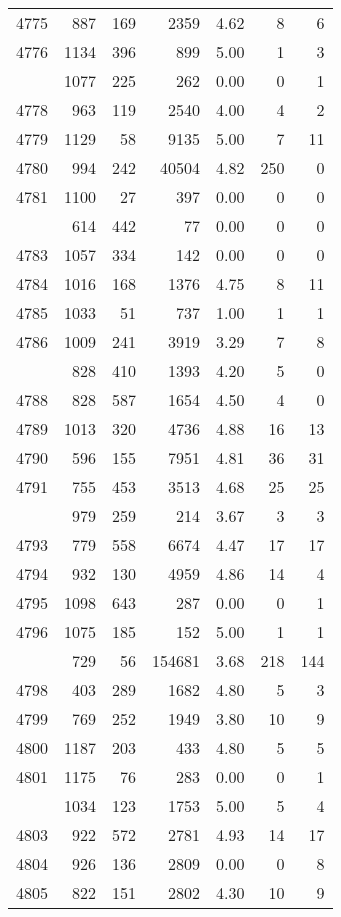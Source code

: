 \documentclass[
]{article}
\begin{document}
\begin{table}
\begin{tabular}[t]{lrrrrrr}
4775 & 887 & 169 & 2359 & 4.62 & 8 & 6\\
4776 & 1134 & 396 & 899 & 5.00 & 1 & 3\\
\addlinespace
4777 & 1077 & 225 & 262 & 0.00 & 0 & 1\\
4778 & 963 & 119 & 2540 & 4.00 & 4 & 2\\
4779 & 1129 & 58 & 9135 & 5.00 & 7 & 11\\
4780 & 994 & 242 & 40504 & 4.82 & 250 & 0\\
4781 & 1100 & 27 & 397 & 0.00 & 0 & 0\\
\addlinespace
4782 & 614 & 442 & 77 & 0.00 & 0 & 0\\
4783 & 1057 & 334 & 142 & 0.00 & 0 & 0\\
4784 & 1016 & 168 & 1376 & 4.75 & 8 & 11\\
4785 & 1033 & 51 & 737 & 1.00 & 1 & 1\\
4786 & 1009 & 241 & 3919 & 3.29 & 7 & 8\\
\addlinespace
4787 & 828 & 410 & 1393 & 4.20 & 5 & 0\\
4788 & 828 & 587 & 1654 & 4.50 & 4 & 0\\
4789 & 1013 & 320 & 4736 & 4.88 & 16 & 13\\
4790 & 596 & 155 & 7951 & 4.81 & 36 & 31\\
4791 & 755 & 453 & 3513 & 4.68 & 25 & 25\\
\addlinespace
4792 & 979 & 259 & 214 & 3.67 & 3 & 3\\
4793 & 779 & 558 & 6674 & 4.47 & 17 & 17\\
4794 & 932 & 130 & 4959 & 4.86 & 14 & 4\\
4795 & 1098 & 643 & 287 & 0.00 & 0 & 1\\
4796 & 1075 & 185 & 152 & 5.00 & 1 & 1\\
\addlinespace
4797 & 729 & 56 & 154681 & 3.68 & 218 & 144\\
4798 & 403 & 289 & 1682 & 4.80 & 5 & 3\\
4799 & 769 & 252 & 1949 & 3.80 & 10 & 9\\
4800 & 1187 & 203 & 433 & 4.80 & 5 & 5\\
4801 & 1175 & 76 & 283 & 0.00 & 0 & 1\\
\addlinespace
4802 & 1034 & 123 & 1753 & 5.00 & 5 & 4\\
4803 & 922 & 572 & 2781 & 4.93 & 14 & 17\\
4804 & 926 & 136 & 2809 & 0.00 & 0 & 8\\
4805 & 822 & 151 & 2802 & 4.30 & 10 & 9\\

\end{tabular}
\end{table}
\end{document}
